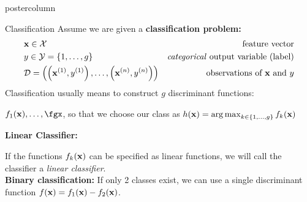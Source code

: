 \documentclass{beamer}
\begin{document}
\begin{frame}[fragile]{}
\begin{columns}
\begin{column}{.31\textwidth}
\begin{beamercolorbox}[center]{postercolumn}
\begin{minipage}{.98\textwidth}
{      		\begin{myblock}{Classification}
%             
            Assume we are given a \textbf{classification problem:}
            \begin{eqnarray*} & \mathbf{x} \in \mathcal{X} \quad & \text{feature vector}\\ & y \in \mathcal{Y} = \{1, \ldots, g\} \quad & \text{\emph{categorical} output variable (label)}\\ &\mathcal{D} = \left( \left(\mathbf{x}^{(1)}, y^{(1)}\right), \ldots, \left(\mathbf{x}^{(n)}, y^{(n)}\right)\right) & \text{observations of $\mathbf{x}$ and $y$} \end{eqnarray*}
            \vspace*{1ex}
            Classification usually means to construct $g$ discriminant functions:
              
              \hspace*{1ex}$f_1(\xv), \ldots, \fgx$, so that we choose our class as $h(\mathbf{x}) = \operatorname{arg\,max}_{k \in \{1, \ldots, g\}} f_{k}(\mathbf{x})$ 
              
              \vspace*{1ex}
            
            
            \textbf{Linear Classifier:}
            
            \hspace*{1ex}If the functions $f_{k}(\mathbf{x})$ can be specified as linear functions, we will call \hspace*{1ex}the classifier a \emph{linear classifier}.\\
            
            
            \textbf{Binary classification: }If only 2 classes exist, we can use a single discriminant function $f(\mathbf{x}) = f_{1}(\mathbf{x}) - f_{2}(\mathbf{x})$.  
    
				  \end{myblock}
			  }
			\end{minipage}
		\end{beamercolorbox}
	\end{column}
\end{columns}

\end{frame}
\end{document}
